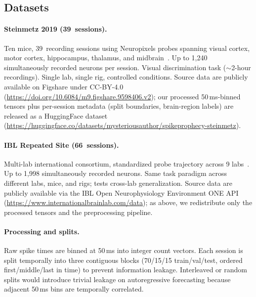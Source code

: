 \documentclass{article}
\begin{document}
\subsection{Datasets}
\label{sec:datasets}

\paragraph{Steinmetz 2019 (39~sessions).}
Ten mice, 39~recording sessions using Neuropixels probes spanning
visual cortex, motor cortex, hippocampus, thalamus, and
midbrain~\citep{steinmetz2019distributed}.  Up to 1{,}240 simultaneously
recorded neurons per session.  Visual discrimination task
(${\sim}$2-hour recordings).  Single lab, single rig, controlled
conditions.  Source data are publicly available on Figshare under
CC-BY-4.0 (\url{https://doi.org/10.6084/m9.figshare.9598406.v2});
our processed 50\,ms-binned tensors plus per-session metadata
(split boundaries, brain-region labels) are released as a
HuggingFace dataset
(\url{https://huggingface.co/datasets/mysteriousauthor/spikeprophecy-steinmetz}).

\paragraph{IBL Repeated Site (66~sessions).}
Multi-lab international consortium, standardized probe trajectory
across 9 labs~\citep{ibl2023brainwide}.  Up to 1{,}998
simultaneously recorded neurons.  Same task paradigm across different
labs, mice, and rigs; tests cross-lab generalization.  Source data
are publicly available via the IBL Open Neurophysiology Environment
ONE API (\url{https://www.internationalbrainlab.com/data}); as
above, we redistribute only the processed tensors and the
preprocessing pipeline.

\paragraph{Processing and splits.}
Raw spike times are binned at 50\,ms into integer count vectors.
Each session is split temporally into three contiguous blocks
(70/15/15 train/val/test, ordered first/middle/last in time) to
prevent information leakage.  Interleaved or random splits would
introduce trivial leakage on autoregressive forecasting because
adjacent 50\,ms bins are temporally correlated.
\end{document}
